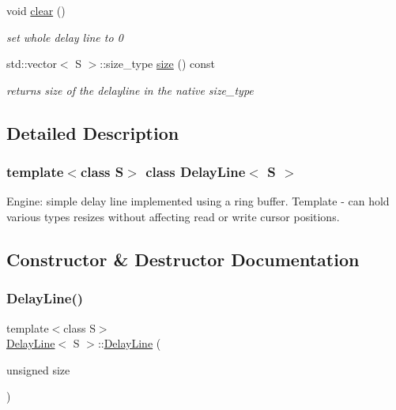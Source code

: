 \begin{DoxyCompactItemize}
void \mbox{\hyperlink{classDelayLine_a469b230b2f26745a0c648e5504ec5e5c}{clear}} ()
\begin{DoxyCompactList}\small\item\em set whole delay line to 0 \end{DoxyCompactList}\item 
std\+::vector$<$ S $>$\+::size\+\_\+type \mbox{\hyperlink{classDelayLine_a20216bac2dde1fe037208ecb718577a7}{size}} () const
\begin{DoxyCompactList}\small\item\em returns size of the delayline in the native size\+\_\+type \end{DoxyCompactList}\end{DoxyCompactItemize}


\subsection{Detailed Description}
\subsubsection*{template$<$class S$>$\newline
class Delay\+Line$<$ S $>$}

Engine\+: simple delay line implemented using a ring buffer. Template -\/ can hold various types resizes without affecting read or write cursor positions. 

\subsection{Constructor \& Destructor Documentation}
\mbox{\label{classDelayLine_a73b757b74c011b83782dce44d158edaa}} 
\subsubsection{\texorpdfstring{Delay\+Line()}{DelayLine()}\hspace{0.1cm}{\footnotesize\ttfamily [1/2]}}
{\footnotesize\ttfamily template$<$class S$>$ \\
\mbox{\hyperlink{classDelayLine}{Delay\+Line}}$<$ S $>$\+::\mbox{\hyperlink{classDelayLine}{Delay\+Line}} (\begin{DoxyParamCaption}\item[{unsigned}]{size }\end{DoxyParamCaption})\hspace{0.3cm}{\ttfamily [inline]}}

